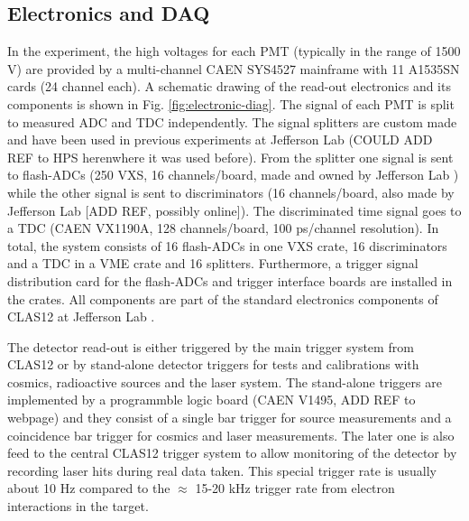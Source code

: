 \documentclass[3p,final,twocolumn]{elsarticle}
\begin{document}
\subsection{Electronics and DAQ}
In the experiment, the high voltages for each PMT (typically in the range of 1500 V) are provided by a multi-channel CAEN SYS4527 mainframe with 11 A1535SN cards (24 channel each).
A schematic drawing of the read-out electronics and its components is shown in Fig. \ref{fig:electronic-diag}. The signal of each PMT is split to measured ADC and TDC independently. 
The signal splitters are custom made and have been used in previous experiments at Jefferson Lab (COULD ADD REF to HPS herenwhere it was used before).
From the splitter one signal is sent to flash-ADCs (250 VXS, 16 channels/board, made and owned by Jefferson Lab \cite{fadc-manual}) while the other signal is sent to  discriminators (16 channels/board, also made by Jefferson Lab [ADD REF, possibly online]).
The discriminated time signal goes to a TDC (CAEN VX1190A, 128 channels/board, 100 ps/channel resolution). 
In total, the system consists of 16 flash-ADCs in one VXS crate, 16 discriminators and a TDC in a VME crate and 16 splitters.  Furthermore, a trigger signal distribution card for the flash-ADCs and trigger interface boards are installed in the crates. All components are part of the standard electronics components of CLAS12 at Jefferson Lab \cite{clas12-daq, clas12-trigger}.

The detector read-out is either triggered by the main trigger system from CLAS12 or by stand-alone detector triggers for tests and calibrations with cosmics, radioactive sources and the laser system. The stand-alone triggers are implemented by a programmble logic board (CAEN V1495, ADD REF to webpage) and they consist of a single bar trigger for source measurements and a coincidence bar trigger for cosmics and laser measurements. The later one is also feed to the central CLAS12 trigger system to allow monitoring of the detector by recording laser hits during real data taken. This special trigger rate is usually about 10 \si{\hertz} compared to the $\approx$ 15-20 \si{\kilo\hertz} trigger rate from electron interactions in the target.
\end{document}
